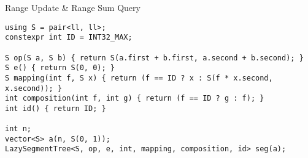 Range Update \& Range Sum Query

\begin{lstlisting}
using S = pair<ll, ll>;
constexpr int ID = INT32_MAX;

S op(S a, S b) { return S(a.first + b.first, a.second + b.second); }
S e() { return S(0, 0); }
S mapping(int f, S x) { return (f == ID ? x : S(f * x.second, x.second)); }
int composition(int f, int g) { return (f == ID ? g : f); }
int id() { return ID; }

int n;
vector<S> a(n, S(0, 1));
LazySegmentTree<S, op, e, int, mapping, composition, id> seg(a);
\end{lstlisting}
